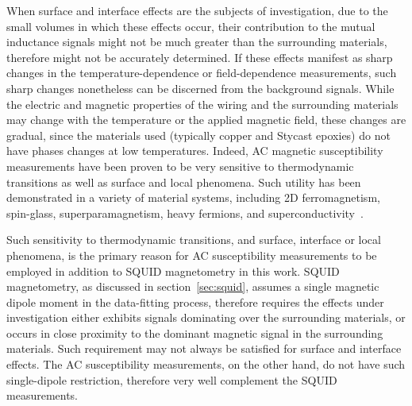 When surface and interface effects are the subjects of investigation, due to the small volumes in which these effects occur, their contribution to the mutual inductance signals might not be much greater than the surrounding materials, therefore might not be accurately determined. If these effects manifest as sharp changes in the temperature-dependence or field-dependence measurements, such sharp changes nonetheless can be discerned from the background signals. While the electric and magnetic properties of the wiring and the surrounding materials may change with the temperature or the applied magnetic field, these changes are gradual, since the materials used (typically copper and Stycast epoxies) do not have phases changes at low temperatures. Indeed, AC magnetic susceptibility measurements have been proven to be very sensitive to thermodynamic transitions as well as surface and local phenomena. Such utility has been demonstrated in a variety of material systems, including 2D ferromagnetism, spin-glass, superparamagnetism, heavy fermions, and superconductivity~\cite{ac_nitroxide, ac_spin_glass, ac_superpara, Ando1994, Gegenwart2005, Schemm2014}.

Such sensitivity to thermodynamic transitions, and surface, interface or local phenomena, is the primary reason for AC susceptibility measurements to be employed in addition to SQUID magnetometry in this work. SQUID magnetometry, as discussed in section~\ref{sec:squid}, assumes a single magnetic dipole moment in the data-fitting process, therefore requires the effects under investigation either exhibits signals dominating over the surrounding materials, or occurs in close proximity to the dominant magnetic signal in the surrounding materials. Such requirement may not always be satisfied for surface and interface effects. The AC susceptibility measurements, on the other hand, do not have such single-dipole restriction, therefore very well complement the SQUID measurements.